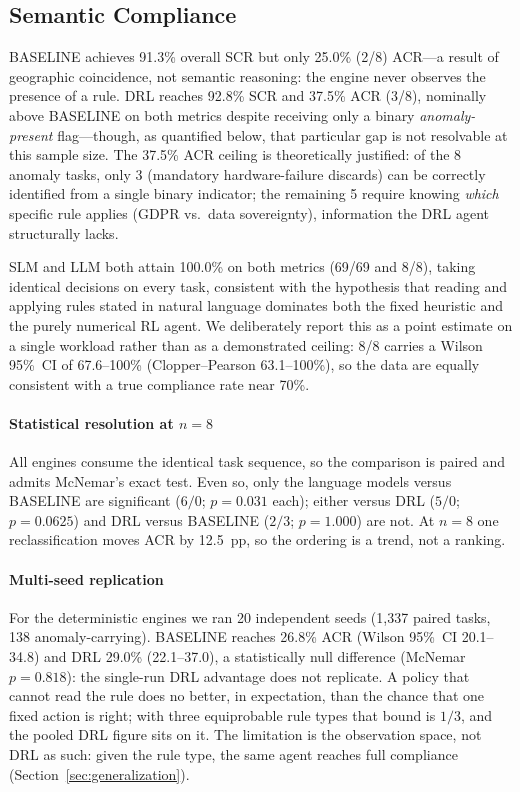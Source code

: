 \documentclass[conference,comsoc,twoside,caption=false]{IEEEtran}
\theoremstyle{definition}
\begin{document}
\subsection{Semantic Compliance}
\label{sec:compliance}

BASELINE achieves 91.3\% overall SCR but only
25.0\% (2/8) ACR---a result of geographic
coincidence, not semantic reasoning: the engine never observes the presence of
a rule. DRL reaches 92.8\% SCR and
37.5\% ACR (3/8), nominally above BASELINE on both
metrics despite receiving only a binary \emph{anomaly-present} flag---though,
as quantified below, that particular gap is not resolvable at this sample size. The 37.5\%
ACR ceiling is theoretically justified: of the 8 anomaly tasks, only 3
(mandatory hardware-failure discards) can be correctly identified from a single
binary indicator; the remaining 5 require knowing \emph{which} specific rule
applies (GDPR vs.\ data sovereignty), information the DRL agent structurally
lacks.

SLM and LLM both attain 100.0\% on both metrics (69/69 and 8/8), taking
identical decisions on every task, consistent with the hypothesis
that reading and applying rules stated in natural language dominates both the
fixed heuristic and the purely numerical RL agent. We deliberately report this
as a point estimate on a single workload rather than as a demonstrated ceiling:
8/8 carries a Wilson 95\%~CI of 67.6--100\% (Clopper--Pearson 63.1--100\%), so
the data are equally consistent with a true compliance rate near 70\%.

\paragraph*{Statistical resolution at $n=8$}
All engines consume the identical task sequence, so the comparison is paired and
admits McNemar's exact test. Even so, only the language models versus BASELINE are
significant ($6/0$; $p=0.031$ each); either versus DRL ($5/0$; $p=0.0625$) and
DRL versus BASELINE ($2/3$; $p=1.000$) are not. At $n=8$ one
reclassification moves ACR by 12.5~pp, so the ordering is a trend, not a
ranking.

\paragraph*{Multi-seed replication}
For the deterministic engines we ran 20 independent seeds (1{,}337 paired tasks,
138 anomaly-carrying). BASELINE reaches 26.8\% ACR (Wilson 95\%~CI 20.1--34.8)
and DRL 29.0\% (22.1--37.0), a statistically null difference (McNemar
$p=0.818$): the single-run DRL advantage does not replicate. A policy that cannot
read the rule does no better, in expectation, than the chance that one fixed
action is right; with three equiprobable rule types that bound is $1/3$, and the
pooled DRL figure sits on it. The limitation is the observation space, not DRL
as such: given the rule type, the same agent reaches full compliance
(Section~\ref{sec:generalization}).
\end{document}
